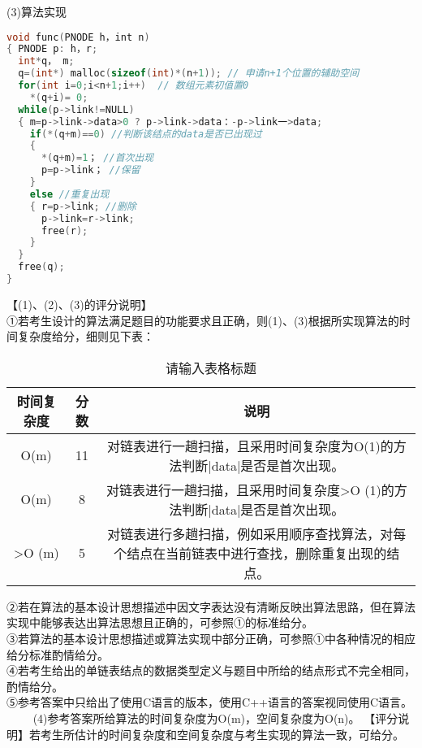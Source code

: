 (3)算法实现 \\
\begin{lstlisting}[language=cpp]
void func(PNODE h，int n)
{ PNODE p: h，r;
  int*q， m;
  q=(int*) malloc(sizeof(int)*(n+1)); // 申请n+1个位置的辅助空间
  for(int i=0;i<n+1;i++)  // 数组元素初值置0
    *(q+i)= 0;
  while(p->link!=NULL)
  { m=p->link->data>0 ? p->link->data：-p->link一>data;
    if(*(q+m)==0) //判断该结点的data是否已出现过
    { 
      *(q+m)=1； //首次出现
      p=p->link； //保留
    }
    else //重复出现
    { r=p->link; //删除
      p->link=r->link;
      free(r);
    }
  }
  free(q);
}
\end{lstlisting}
【(1)、(2)、(3)的评分说明】 \\
①若考生设计的算法满足题目的功能要求且正确，则(1)、(3)根据所实现算法的时间复杂度给分，细则见下表：
\begin{table}[ht]
\centering
\caption{请输入表格标题}\label{CSN15_tab2}
\begin{tabular}{|c|c|c|}
\hline
时间复杂度 &分数 &说明  \\
\hline
O(m) &11 &对链表进行一趟扫描，且采用时间复杂度为O(1)的方法判断|data|是否是首次出现。  \\
\hline
O(m) &8 &对链表进行一趟扫描，且采用时间复杂度>O (1)的方法判断|data|是否是首次出现。  \\
\hline
>O (m) &5 &对链表进行多趟扫描，例如采用顺序查找算法，对每个结点在当前链表中进行查找，删除重复出现的结点。  \\
\hline
\end{tabular}
\end{table}
②若在算法的基本设计思想描述中因文字表达没有清晰反映出算法思路，但在算法实现中能够表达出算法思想且正确的，可参照①的标准给分。 \\
③若算法的基本设计思想描述或算法实现中部分正确，可参照①中各种情况的相应给分标准酌情给分。\\
④若考生给出的单链表结点的数据类型定义与题目中所给的结点形式不完全相同，酌情给分。 \\
⑤参考答案中只给出了使用C语言的版本，使用C++语言的答案视同使用C语言。 \\
$\qquad$ (4)参考答案所给算法的时间复杂度为O(m)，空间复杂度为O(n)。
【评分说明】若考生所估计的时间复杂度和空间复杂度与考生实现的算法一致，可给分。

